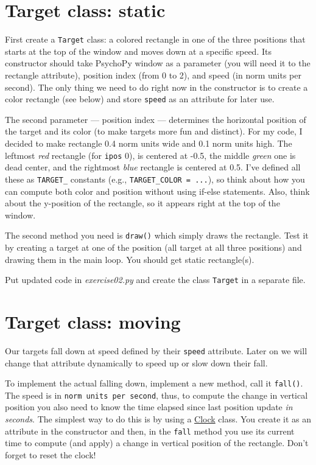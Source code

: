 \documentclass[
]{book}
\begin{document}
\hypertarget{target-class-static}{%
\section{Target class: static}\label{target-class-static}}

First create a \texttt{Target} class: a colored rectangle in one of the three positions that starts at the top of the window and moves down at a specific speed. Its constructor should take PsychoPy window as a parameter (you will need it to the rectangle attribute), position index (from 0 to 2), and speed (in norm units per second). The only thing we need to do right now in the constructor is to create a color rectangle (see below) and store \texttt{speed} as an attribute for later use.

The second parameter --- position index --- determines the horizontal position of the target and its color (to make targets more fun and distinct). For my code, I decided to make rectangle 0.4 norm units wide and 0.1 norm units high. The leftmost \emph{red} rectangle (for \texttt{ipos} 0), is centered at -0.5, the middle \emph{green} one is dead center, and the rightmost \emph{blue} rectangle is centered at 0.5. I've defined all these as \texttt{TARGET\_} constants (e.g., \texttt{TARGET\_COLOR\ =\ ...}), so think about how you can compute both color and position without using if-else statements. Also, think about the y-position of the rectangle, so it appears right at the top of the window.

The second method you need is \texttt{draw()} which simply draws the rectangle. Test it by creating a target at one of the position (all target at all three positions) and drawing them in the main loop. You should get static rectangle(s).

Put updated code in \emph{exercise02.py} and create the class \texttt{Target} in a separate file.

\hypertarget{target-class-moving}{%
\section{Target class: moving}\label{target-class-moving}}

Our targets fall down at speed defined by their \texttt{speed} attribute. Later on we will change that attribute dynamically to speed up or slow down their fall.

To implement the actual falling down, implement a new method, call it \texttt{fall()}. The speed is in \texttt{norm\ units\ per\ second}, thus, to compute the change in vertical position you also need to know the time elapsed since last position update \emph{in seconds}. The simplest way to do this is by using a \href{https://psychopy.org/api/clock.html\#psychopy.clock.Clock}{Clock} class. You create it as an attribute in the constructor and then, in the \texttt{fall} method you use its current time to compute (and apply) a change in vertical position of the rectangle. Don't forget to reset the clock!
\end{document}

